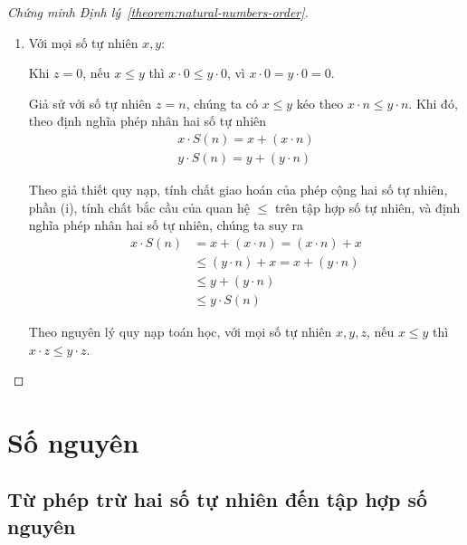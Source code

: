 \begin{proof}[Chứng minh Định lý~\ref{theorem:natural-numbers-order}]
\begin{enumerate}[label={(\roman*)}]
		      Từ hai đẳng thức $(x + z) + a = y + z$ và $(x + z) + a = (x + a) + z$, chúng ta suy ra $(x + a) + z = y + z$. Theo Mệnh đề~\ref{proposition:addition-cancellation}, chúng ta suy ra $x + a = y$. Theo định nghĩa quan hệ $\leq$ trên tập hợp số tự nhiên, $x\leq y$.

		      Vậy với mọi số tự nhiên $x, y, z$, $x\leq y$ khi và chỉ khi $x + z \leq y + z$.
		\item Với mọi số tự nhiên $x, y$:

		      Khi $z = 0$, nếu $x\leq y$ thì $x\cdot 0\leq y\cdot 0$, vì $x\cdot 0 = y\cdot 0 = 0$.

		      Giả sử với số tự nhiên $z = n$, chúng ta có $x\leq y$ kéo theo $x\cdot n\leq y\cdot n$. Khi đó, theo định nghĩa phép nhân hai số tự nhiên
		      \[
			      \begin{split}
				      x\cdot S(n) = x + (x\cdot n) \\
				      y\cdot S(n) = y + (y\cdot n)
			      \end{split}
		      \]

		      Theo giả thiết quy nạp, tính chất giao hoán của phép cộng hai số tự nhiên, phần (i), tính chất bắc cầu của quan hệ $\leq$ trên tập hợp số tự nhiên, và định nghĩa phép nhân hai số tự nhiên, chúng ta suy ra
		      \begin{align*}
			      x\cdot S(n) & = x + (x\cdot n) = (x\cdot n) + x    \\
			                  & \leq (y\cdot n) + x = x + (y\cdot n) \\
			                  & \leq y + (y\cdot n)                  \\
			                  & \leq y\cdot S(n)
		      \end{align*}

		      Theo nguyên lý quy nạp toán học, với mọi số tự nhiên $x, y, z$, nếu $x\leq y$ thì $x\cdot z\leq y\cdot z$.
	\end{enumerate}
\end{proof}

\section{Số nguyên}\label{section:integers}

\subsection*{Từ phép trừ hai số tự nhiên đến tập hợp số nguyên}


